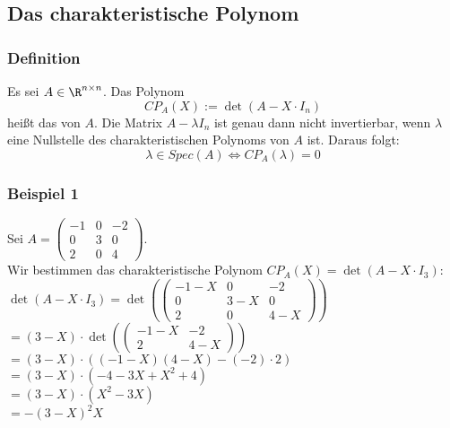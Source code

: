 \subsection{Das charakteristische Polynom}
\begin{frame}\frametitle{Definition}
Es sei $A \in \R^{n\times n}$. Das Polynom
$$
CP_A(X):=\det(A-X\cdot I_n)
$$
heißt das  von $A$.
\vfill \pause
Die Matrix $A-\lambda I_n$ ist genau dann nicht invertierbar, wenn $\lambda$ eine Nullstelle des charakteristischen Polynoms von $A$ ist. Daraus folgt:
$$
\lambda \in Spec(A) \Longleftrightarrow CP_A(\lambda)=0
$$
\end{frame}
%
%
\begin{frame}\frametitle{Beispiel 1}
Sei $A=\begin{pmatrix} -1 & 0 & -2 \\ 0 & 3 & 0 \\ 2 & 0 &4 \end{pmatrix}$. \\Wir bestimmen das charakteristische Polynom $CP_A(X)=\det(A-X\cdot I_3)$:\\ \vfill\pause
$
\det(A-X\cdot I_3)=\det(\begin{pmatrix} -1-X & 0 & -2 \\ 0 & 3-X & 0 \\ 2 & 0 &4-X \end{pmatrix})$\\\pause
\hspace{24.5mm}$=(3-X)\cdot \det(\begin{pmatrix} -1-X &  -2 \\ 2 &4-X \end{pmatrix})$\\\pause
\hspace{24.5mm}$=(3-X)\cdot ((-1-X)(4-X)-(-2)\cdot2)$\\\pause
\hspace{24.5mm}$=(3-X)\cdot(-4-3X+X^2+4)$\\\pause
\hspace{24.5mm}$=(3-X)\cdot(X^2-3X)$\\\pause
\hspace{24.5mm}$=-(3-X)^2X
$
\end{frame}
%
%
